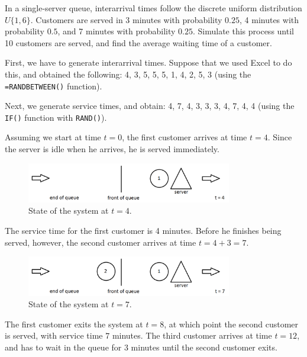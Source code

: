 \begin{myexample}\label{ex:4_queue}
	In a single-server queue, interarrival times follow the discrete uniform distribution $U\{1,6\}$.
	Customers are served in 3 minutes with probability $0.25$, 4 minutes with probability $0.5$, and 7 minutes with probability $0.25$.
	Simulate this process until 10 customers are served, and find the average waiting time of a customer.

First, we have to generate interarrival times. 
Suppose that we used Excel to do this, and obtained the following: 4, 3, 5, 5, 5, 1, 4, 2, 5, 3 (using the \texttt{=RANDBETWEEN()} function).

Next, we generate service times, and obtain: 4, 7, 4, 3, 3, 3, 4, 7, 4, 4 (using the \texttt{IF()} function with \texttt{RAND()}).

Assuming we start at time $t = 0$, the first customer arrives at time $t = 4$.
Since the server is idle when he arrives, he is served immediately. 


\begin{figure}[htbp]
	\centering
	\includegraphics[width=0.8\textwidth]{fig/4_queue_ex1a.png}
	\caption{State of the system at $t = 4$. \label{fig:4_queue_ex1a}}
\end{figure}

The service time for the first customer is 4 minutes.
Before he finishes being served, however, the second customer arrives at time $t = 4 + 3 = 7$.


\begin{figure}[htbp]
	\centering
	\includegraphics[width=0.8\textwidth]{fig/4_queue_ex1b.png}
	\caption{State of the system at $t = 7$. \label{fig:4_queue_ex1b}}
\end{figure}


The first customer exits the system at $t = 8$, at which point the second customer is served, with service time $7$ minutes.
The third customer arrives at time $t = 12$, and has to wait in the queue for 3 minutes until the second customer exits.


\end{myexample}
